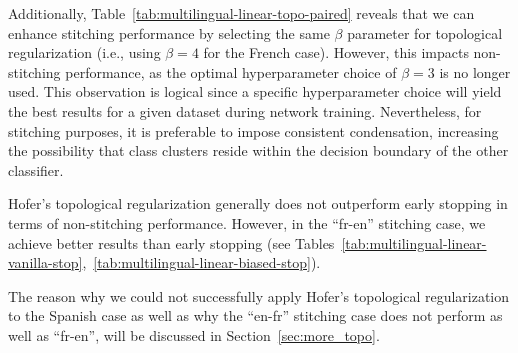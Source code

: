 \documentclass[../main.tex]{subfiles}
\begin{document}
\begin{table}[ht!]
\centering
{}
\caption{Topological reg. w/ matched params (over two random seeds)}
\label{tab:multilingual-linear-topo-paired}
\end{table}

Additionally, Table~\ref{tab:multilingual-linear-topo-paired} reveals that we can enhance stitching performance by selecting the same $\beta$ parameter for topological regularization (i.e., using $\beta=4$ for the French case). However, this impacts non-stitching performance, as the optimal hyperparameter choice of $\beta=3$ is no longer used. This observation is logical since a specific hyperparameter choice will yield the best results for a given dataset during network training. Nevertheless, for stitching purposes, it is preferable to impose consistent condensation, increasing the possibility that class clusters reside within the decision boundary of the other classifier.

\begin{mathNote}
Hofer's topological regularization generally does not outperform early stopping in terms of non-stitching performance. However, in the ``fr-en'' stitching case, we achieve better results than early stopping (see Tables~\ref{tab:multilingual-linear-vanilla-stop},~\ref{tab:multilingual-linear-biased-stop}).
\end{mathNote}

The reason why we could not successfully apply Hofer's topological regularization to the Spanish case as well as why the ``en-fr'' stitching case does not perform as well as ``fr-en'', will be discussed in Section~\ref{sec:more_topo}.\\
\end{document}
